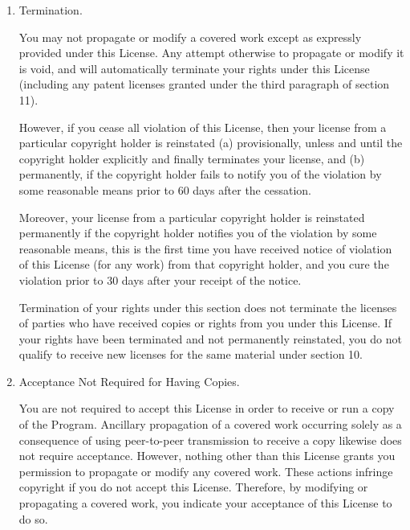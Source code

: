\documentclass[10pt,a4paper,ngerman,titlepage,tocindentauto]{article}
\begin{document}
\begin{multicols}{3}
{\begin{enumerate}
						If you add terms to a covered work in accord with this section, you
						must place, in the relevant source files, a statement of the
						additional terms that apply to those files, or a notice indicating
						where to find the applicable terms.

						Additional terms, permissive or non-permissive, may be stated in the
						form of a separately written license, or stated as exceptions;
						the above requirements apply either way.

						\item Termination.

						You may not propagate or modify a covered work except as expressly
						provided under this License.  Any attempt otherwise to propagate or
						modify it is void, and will automatically terminate your rights under
						this License (including any patent licenses granted under the third
						paragraph of section 11).

						However, if you cease all violation of this License, then your
						license from a particular copyright holder is reinstated (a)
						provisionally, unless and until the copyright holder explicitly and
						finally terminates your license, and (b) permanently, if the copyright
						holder fails to notify you of the violation by some reasonable means
						prior to 60 days after the cessation.

						Moreover, your license from a particular copyright holder is
						reinstated permanently if the copyright holder notifies you of the
						violation by some reasonable means, this is the first time you have
						received notice of violation of this License (for any work) from that
						copyright holder, and you cure the violation prior to 30 days after
						your receipt of the notice.

						Termination of your rights under this section does not terminate the
						licenses of parties who have received copies or rights from you under
						this License.  If your rights have been terminated and not permanently
						reinstated, you do not qualify to receive new licenses for the same
						material under section 10.

						\item Acceptance Not Required for Having Copies.

						You are not required to accept this License in order to receive or
						run a copy of the Program.  Ancillary propagation of a covered work
						occurring solely as a consequence of using peer-to-peer transmission
						to receive a copy likewise does not require acceptance.  However,
						nothing other than this License grants you permission to propagate or
						modify any covered work.  These actions infringe copyright if you do
						not accept this License.  Therefore, by modifying or propagating a
						covered work, you indicate your acceptance of this License to do so.


\end{enumerate}}
\end{multicols}
\end{document}

